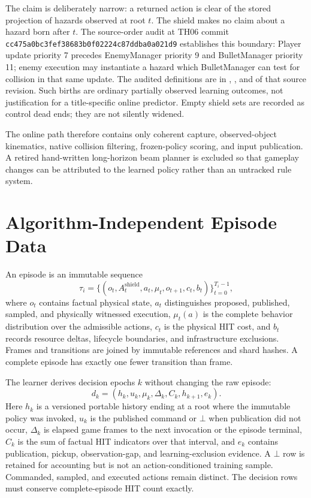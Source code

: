 \documentclass[11pt]{article}
\begin{document}
The claim is deliberately narrow: a returned action is clear of the stored
projection of hazards observed at root $t$.  The shield makes no claim about a
hazard born after $t$.  The source-order audit at TH06 commit
\texttt{cc475a0bc3fef38683b0f02224c87ddba0a021d9} establishes this boundary:
Player update priority 7 precedes EnemyManager priority 9 and BulletManager
priority 11; enemy execution may instantiate a hazard which BulletManager can
test for collision in that same update.  The audited definitions are in
, , and
 of that source revision.  Such births are ordinary
partially observed learning outcomes, not justification for a title-specific
online predictor.  Empty shield sets are recorded as control dead ends; they
are not silently widened.

The online path therefore contains only coherent capture, observed-object
kinematics, native collision filtering, frozen-policy scoring, and input
publication.  A retired hand-written long-horizon beam planner is excluded so
that gameplay changes can be attributed to the learned policy rather than an
untracked rule system.

\section{Algorithm-Independent Episode Data}

An episode is an immutable sequence
\begin{equation}
  \tau_i = \{(o_t, A_t^{\mathrm{shield}}, a_t, \mu_t,
              o_{t+1}, c_t, b_t)\}_{t=0}^{T_i-1},
\end{equation}
where $o_t$ contains factual physical state, $a_t$ distinguishes proposed,
published, sampled, and physically witnessed execution, $\mu_t(a)$ is the
complete behavior distribution over the admissible actions, $c_t$ is the
physical HIT cost, and $b_t$ records resource deltas, lifecycle boundaries, and
infrastructure exclusions.  Frames and transitions are joined by immutable
references and shard hashes.  A complete episode has exactly one fewer
transition than frame.

The learner derives decision epochs $k$ without changing the raw episode:
\begin{equation}
  d_k=(h_k,u_k,\mu_k,\Delta_k,C_k,h_{k+1},e_k).
\end{equation}
Here $h_k$ is a versioned portable history ending at a root where the immutable
policy was invoked, $u_k$ is the published command or $\bot$ when publication
did not occur, $\Delta_k$ is elapsed game frames to the next invocation or the
episode terminal, $C_k$ is the sum of factual HIT indicators over that interval,
and $e_k$ contains
publication, pickup, observation-gap, and learning-exclusion evidence.  A
$\bot$ row is retained for accounting but is not an action-conditioned training
sample.  Commanded, sampled, and executed actions remain distinct.  The
decision rows must conserve complete-episode HIT count exactly.
\end{document}
